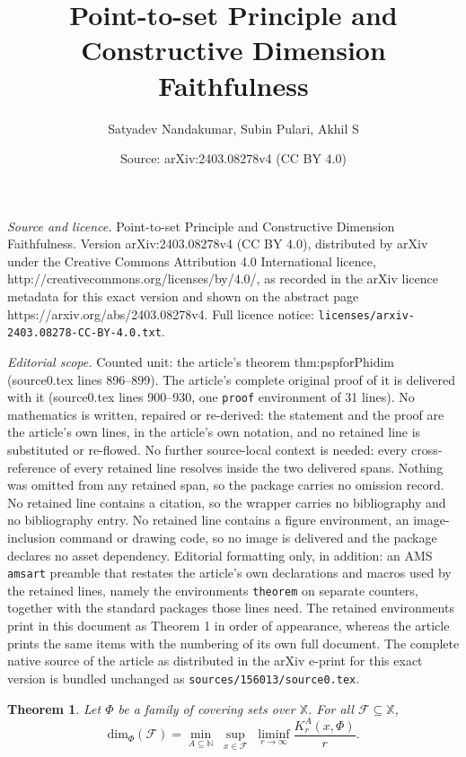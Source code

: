 \documentclass[10pt,a4paper]{amsart}
\title{Point-to-set Principle and Constructive Dimension Faithfulness}
\author{Satyadev Nandakumar, Subin Pulari, Akhil S}
\date{Source: arXiv:2403.08278v4 (CC BY 4.0)}
\newtheorem{theorem}{Theorem}
\newcommand{\N}{\mathbb{N}}
\newcommand{\X}{{\mathbb{X}}}
\renewcommand{\dim}{{\mathrm{dim}}}
\newcommand{\x}{x}
\begin{document}
\maketitle

\noindent\emph{Source and licence.} Point-to-set Principle and Constructive Dimension Faithfulness. Version arXiv:2403.08278v4 (CC BY 4.0), distributed by arXiv under the Creative Commons Attribution 4.0 International licence, http://creativecommons.org/licenses/by/4.0/, as recorded in the arXiv licence metadata for this exact version and shown on the abstract page https://arxiv.org/abs/2403.08278v4. Full licence notice: \texttt{licenses/arxiv-2403.08278-CC-BY-4.0.txt}.\par\smallskip

\noindent\textit{Editorial scope.} Counted unit: the article's theorem thm:pspforPhidim (source0.tex lines 896--899). The article's complete original proof of it is delivered with it (source0.tex lines 900--930, one \texttt{proof} environment of 31 lines). No mathematics is written, repaired or re-derived: the statement and the proof are the article's own lines, in the article's own notation, and no retained line is substituted or re-flowed.  No further source-local context is needed: every cross-reference of every retained line resolves inside the two delivered spans.  Nothing was omitted from any retained span, so the package carries no omission record.  No retained line contains a citation, so the wrapper carries no bibliography and no bibliography entry.  No retained line contains a figure environment, an image-inclusion command or drawing code, so no image is delivered and the package declares no asset dependency.  Editorial formatting only, in addition: an AMS \texttt{amsart} preamble that restates the article's own declarations and macros used by the retained lines, namely the environments \texttt{theorem} on separate counters, together with the standard packages those lines need.  The retained environments print in this document as Theorem 1 in order of appearance, whereas the article prints the same items with the numbering of its own full document.  The complete native source of the article as distributed in the arXiv e-print for this exact version is bundled unchanged as \texttt{sources/156013/source0.tex}.
\begin{theorem}\label{thm:pspforPhidim}
	Let $\Phi$ be a family of  covering sets over $\X$. For all $\mathcal{F} \subseteq \X$, 
	$$\dim_\Phi(\mathcal{F}) = \min\limits_{A \subseteq \N} \; \sup\limits_{\x \in \mathcal{F}} \; \liminf_{r \rightarrow \infty} \frac{K_r^A(\x, \Phi)}{r}.$$
\end{theorem}
\end{document}
